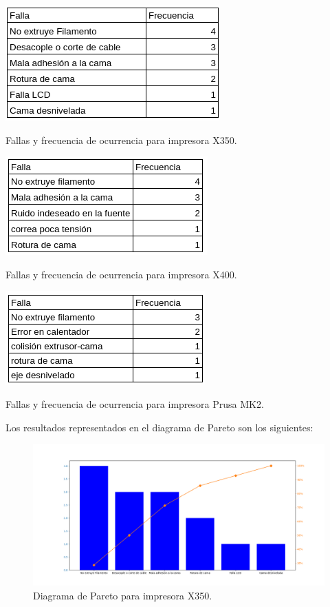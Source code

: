 \begin{table}[H]
\centering
\includegraphics[scale=1]{images/dataparetox350.png}
\caption{Fallas y frecuencia de ocurrencia para impresora X350.}
\label{dataparetox350}
\end{table}


\begin{table}[H]
\centering
\includegraphics[scale=1]{images/dataparetox400.png}
\caption{Fallas y frecuencia de ocurrencia para impresora X400.}
\label{dataparetox400}
\end{table}


\begin{table}[H]
\centering
\includegraphics[scale=1]{images/dataparetomk2.png}
\caption{Fallas y frecuencia de ocurrencia para impresora Prusa MK2.}
\label{dataparetomk2}
\end{table}

Los resultados representados en el diagrama de Pareto son los siguientes:

\begin{figure}[H]
\centering
\includegraphics[scale=0.35]{images/paretox350.png}
\caption{Diagrama de Pareto para impresora X350.}
\label{paretox350}
\end{figure}

